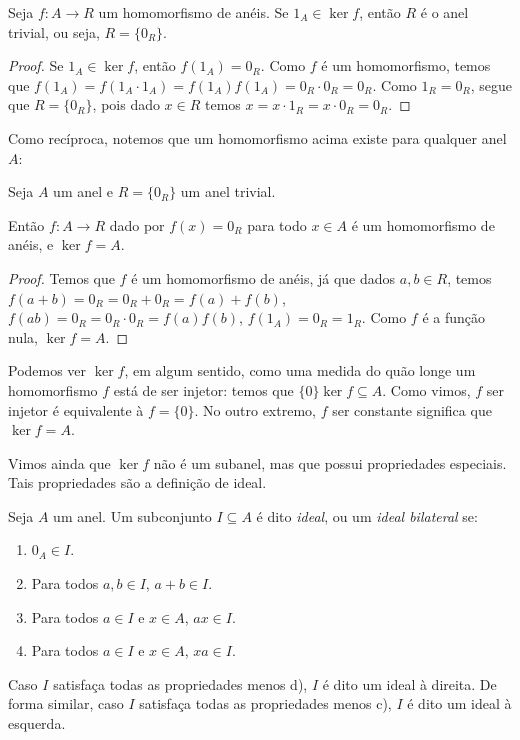 \begin{prop}
    Seja $f:A\rightarrow R$ um homomorfismo de anéis. Se $1_A \in \ker f$, então $R$ é o anel trivial, ou seja, $R=\{0_R\}$.
\end{prop}

\begin{proof}
    Se $1_A \in \ker f$, então $f(1_A)=0_R$.
    Como $f$ é um homomorfismo, temos que $f(1_A)=f(1_A\cdot 1_A)=f(1_A)f(1_A)=0_R\cdot 0_R=0_R$.
    Como $1_R=0_R$, segue que $R=\{0_R\}$, pois dado $x \in R$ temos $x=x\cdot 1_R=x\cdot 0_R=0_R$.
\end{proof}

Como recíproca, notemos que um homomorfismo acima existe para qualquer anel $A$:

\begin{prop}
    Seja $A$ um anel e $R=\{0_R\}$ um anel trivial.
    
    Então $f:A\rightarrow R$ dado por $f(x)=0_R$ para todo $x \in A$ é um homomorfismo de anéis, e $\ker f=A$.
\end{prop}

\begin{proof}
    Temos que $f$ é um homomorfismo de anéis, já que dados $a, b \in R$, temos $f(a+b)=0_R=0_R+0_R=f(a)+f(b)$, $f(ab)=0_R=0_R\cdot 0_R=f(a)f(b)$, $f(1_A)=0_R=1_R$.
    Como $f$ é a função nula, $\ker f=A$.
\end{proof}

Podemos ver $\ker f$, em algum sentido, como uma medida do quão longe um homomorfismo $f$ está de ser injetor: temos que $\{0\}\ker f\subseteq A$.
Como vimos, $f$ ser injetor é equivalente à $f=\{0\}$.
No outro extremo, $f$ ser constante significa que $\ker f = A$.

Vimos ainda que $\ker f$ não é um subanel, mas que possui propriedades especiais. Tais propriedades são a definição de ideal.

\begin{definition}[Ideal]
    Seja $A$ um anel.
    Um subconjunto $I \subseteq A$ é dito \emph{ideal}, ou um \emph{ideal bilateral} se:

    \begin{enumerate}[label=\alph*)]
        \item $0_A \in I$.
        \item Para todos $a, b \in I$, $a+b \in I$.
        \item Para todos $a \in I$ e $x \in A$, $ax \in I$.
        \item Para todos $a \in I$ e $x \in A$, $xa \in I$.
    \end{enumerate}

    Caso $I$ satisfaça todas as propriedades menos d), $I$ é dito um ideal à direita.
    De forma similar, caso $I$ satisfaça todas as propriedades menos c), $I$ é dito um ideal à esquerda.
\end{definition}

